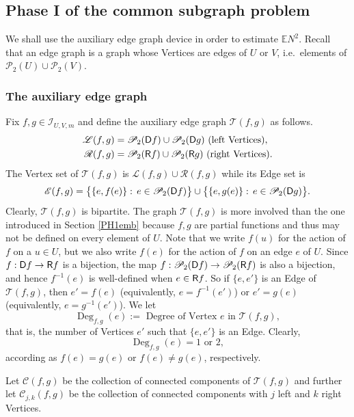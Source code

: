 \documentclass[reqno]{amsart}
\theoremstyle{theorem}
\theoremstyle{definition}
\theoremstyle{remark}
\def\P{\mathbb{P}}
\def\E{\mathbb{E}}
\def\PP{\mathscr{P}}
\def\LL{\mathscr{L}}
\def\RR{\mathscr{R}}
\def\TT{\mathscr{T}}
\def\CC{\mathscr{C}}
\def\EE{\mathscr{E}}
\newcommand{\1}{{\text{\Large $\mathfrak 1$}}}	%
\numberwithin{equation}{section}
\def\II{\mathscr I}
\def\ran{{\sf R}}
\def\dom{{\sf D}}
\def\Deg{\operatorname{Deg}}
\begin{document}
\subsection{\bfseries Phase I of the common subgraph problem}
We shall use the auxiliary edge graph device
in order to estimate $\E N^2$.
Recall that an edge graph is a graph whose Vertices are 
edges of $U$ or $V$, i.e.\ elements of $\PP_2(U) \cup \PP_2(V)$.


\subsubsection{\bfseries The auxiliary edge graph}
Fix $f,g \in \II_{U,V,m}$ and define the auxiliary edge graph
$\TT(f,g)$ as follows.
\begin{align*}
\LL(f,g) &= \PP_2(\dom f) \cup \PP_2(\dom g) \text{ (left Vertices)},
\\
\RR(f,g) &= \PP_2(\ran f) \cup \PP_2(\ran g) \text{ (right Vertices)}.
\end{align*}
The Vertex set of $\TT(f,g)$ is $\LL(f,g) \cup \RR(f,g)$ 
while its Edge set is
\[
\EE(f,g) = \big\{ \{e, f(e)\}:\, e \in \PP_2(\dom f) \big\}
\cup \big\{ \{e, g(e)\}:\, e \in \PP_2(\dom g) \big\}.
\]
Clearly, $\TT(f,g)$ is bipartite. 
The graph $\TT(f,g)$ is more involved than the one introduced in 
Section \ref{PH1emb} because $f, g$ are partial functions
and thus may not be defined on every element of $U$.
Note that we write $f(u)$ for the action of $f$ on a $u \in U$,
but we also write $f(e)$ for the action of $f$ on an edge $e$ of $U$.
Since $f : \dom f \to \ran f$ is a bijection, the map
$f: \PP_2(\dom f) \to \PP_2(\ran f)$ is also a bijection,
and hence $f^{-1}(e)$ is well-defined when $e \in \ran f$.
So if $\{e,e'\}$ is an Edge of $\TT(f,g)$, 
then $e'=f(e)$ (equivalently, $e=f^{-1}(e')$) 
or $e'=g(e)$  (equivalently, $e=g^{-1}(e')$).
We let
\[
\Deg_{f,g}(e) := \text{ Degree of Vertex $e$ in $\TT(f,g)$},
\]
that is, the number of Vertices $e'$ such that $\{e,e'\}$ is an Edge.
Clearly,
\[
\Deg_{f,g}(e) = 1 \text{ or } 2, 
\]
according as $f(e)=g(e)$ or $f(e) \neq g(e)$, respectively.

Let $\CC(f,g)$ be the collection of connected components of $\TT(f,g)$
and further let $\CC_{j,k}(f,g)$ be the collection of connected components
with $j$ left and $k$ right Vertices.
\end{document}
